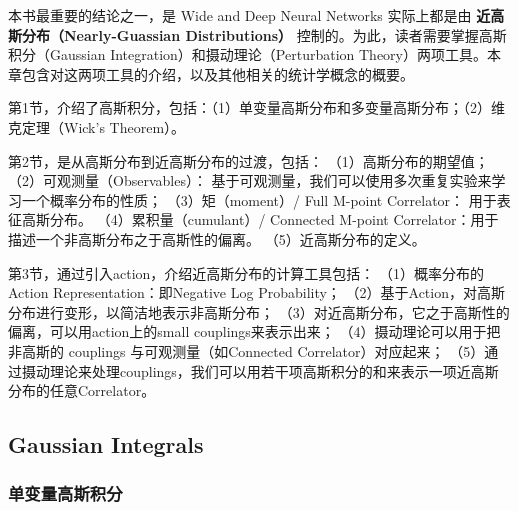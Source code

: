 本书最重要的结论之一，是 Wide and Deep Neural Networks 实际上都是由 \textbf{近高斯分布（Nearly-Guassian Distributions）} 控制的。为此，读者需要掌握高斯积分（Gaussian Integration）和摄动理论（Perturbation Theory）两项工具。本章包含对这两项工具的介绍，以及其他相关的统计学概念的概要。


第1节，介绍了高斯积分，包括：（1）单变量高斯分布和多变量高斯分布；（2）维克定理（Wick's Theorem）。


第2节，是从高斯分布到近高斯分布的过渡，包括：
（1）高斯分布的期望值；
（2）可观测量（Observables）：
 基于可观测量，我们可以使用多次重复实验来学习一个概率分布的性质；
（3）矩（moment）/ Full M-point Correlator： 用于表征高斯分布。
（4）累积量（cumulant）/ Connected M-point Correlator：用于描述一个非高斯分布之于高斯性的偏离。
（5）近高斯分布的定义。



第3节，通过引入action，介绍近高斯分布的计算工具包括：
（1）概率分布的Action Representation：即Negative Log Probability；
（2）基于Action，对高斯分布进行变形，以简洁地表示非高斯分布；
（3）对近高斯分布，它之于高斯性的偏离，可以用action上的small couplings来表示出来；
（4）摄动理论可以用于把非高斯的 couplings 与可观测量（如Connected Correlator）对应起来；
（5）通过摄动理论来处理couplings，我们可以用若干项高斯积分的和来表示一项近高斯分布的任意Correlator。

\subsection{Gaussian Integrals}
\subsubsection{单变量高斯积分}

